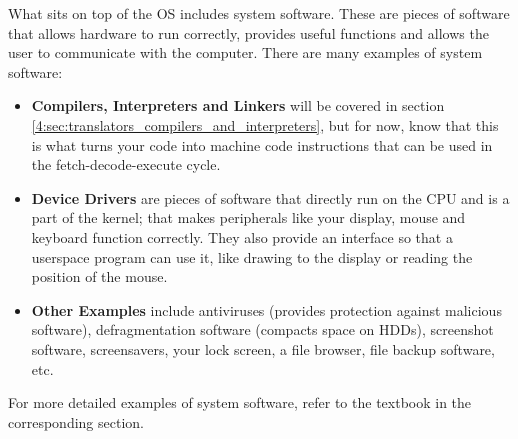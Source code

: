 \documentclass[../main.tex]{subfiles}
\begin{document}
What sits on top of the OS includes system software. These are pieces of software that allows hardware to run correctly, provides useful functions and allows the user to communicate with the computer. There are many examples of system software:

\begin{itemize}
    \item \textbf{Compilers, Interpreters and Linkers} will be covered in section \ref{4:sec:translators_compilers_and_interpreters}, but for now, know that this is what turns your code into machine code instructions that can be used in the fetch-decode-execute cycle.
    \item \textbf{Device Drivers} are pieces of software that directly run on the CPU and is a part of the kernel; that makes peripherals like your display, mouse and keyboard function correctly. They also provide an interface so that a userspace program can use it, like drawing to the display or reading the position of the mouse.
    \item \textbf{Other Examples} include antiviruses (provides protection against malicious software), defragmentation software (compacts space on HDDs), screenshot software, screensavers, your lock screen, a file browser, file backup software, etc.
\end{itemize}

For more detailed examples of system software, refer to the textbook in the corresponding section.
\end{document}
